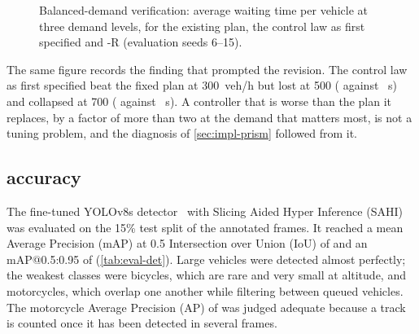 \begin{figure}[htbp]
\centering
{}
\caption{Balanced-demand verification: average waiting time per vehicle at three demand levels, for the existing plan, the control law as first specified and \prism{}-R (evaluation seeds 6--15).}
\label{fig:eval-mock}
\end{figure}

The same figure records the finding that prompted the revision. The control law as first specified beat the fixed plan at 300~veh/h but lost at 500 ( against ~s) and collapsed at 700 ( against ~s). A controller that is worse than the plan it replaces, by a factor of more than two at the demand that matters most, is not a tuning problem, and the diagnosis of \cref{sec:impl-prism} followed from it.

\subsection{\dtx{} accuracy}\label{sec:eval-dtx}

The fine-tuned YOLOv8s detector~\cite{jocher2023yolov8} with Slicing Aided Hyper Inference (SAHI)~\cite{akyon2022sahi} was evaluated on the 15\% test split of the  annotated frames. It reached a mean Average Precision (mAP) at 0.5 Intersection over Union (IoU) of  and an mAP@0.5:0.95 of  (\cref{tab:eval-det}). Large vehicles were detected almost perfectly; the weakest classes were bicycles, which are rare and very small at  altitude, and motorcycles, which overlap one another while filtering between queued vehicles. The motorcycle Average Precision (AP) of  was judged adequate because a track is counted once it has been detected in several frames.

